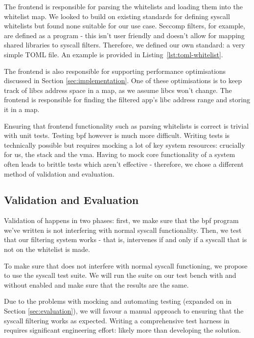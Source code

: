 The frontend is responsible for parsing the \af whitelists and loading them into
the whitelist map. We looked to build on existing standards for defining
syscall whitelists but found none suitable for our use case. Seccomp filters,
for example, are defined as a  program - this isn't user friendly and
doesn't allow for mapping shared libraries to syscall filters. Therefore, we defined our
own standard: a very simple TOML file. An example is provided in
Listing~\ref{lst:toml-whitelist}.

The frontend is also responsible for supporting performance optimisations
discussed in Section \ref{sec:implementation}. One of these optimisations is
to keep track of \acp{libc} address space in a map, as we assume \acp{libc} won't
change. The frontend is responsible for finding the filtered app's \ac{libc}
address range and storing it in a map.

Ensuring that frontend functionality such as parsing whitelists is correct is
trivial with unit tests. Testing \ac{bpf} however is much more difficult.
Writing tests is technically possible but requires mocking a lot of key system
resources: crucially for us, the stack and the \ac{vma}. Having to mock core
functionality of a system often leads to brittle tests which aren't effective -
therefore, we chose a different method of validation and evaluation.

\subsection{Validation and Evaluation}


Validation of \af happens in two phases: first, we make sure that the \ac{bpf}
program we've written is not interfering with normal syscall functionality. Then,
we test that our filtering system works - that is, \af intervenes if and only if
a syscall that is not on the whitelist is made.

To make sure that \af does not interfere with normal syscall functioning, we
propose to use the  syscall test suite. We will run the suite on our
test bench with and without \af enabled and make sure that the results are the
same.

Due to the problems with mocking and automating testing (expanded on in Section
\ref{sec:evaluation}), we will favour a manual approach to ensuring that the 
syscall filtering works as expected. Writing a comprehensive test harness in requires 
significant engineering effort: likely more than developing the solution. 


